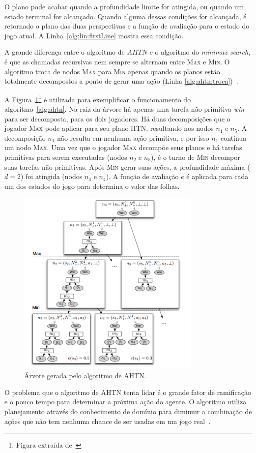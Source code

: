 O plano pode acabar quando a profundidade limite for atingida, ou quando um estado terminal for alcançado.
Quando alguma dessas condições for alcançada, é retornado o plano das duas perspectivas e a função de avaliação para o estado do jogo atual. A Linha~\ref{alg:lin:firstLine} mostra essa condição.

A grande diferença entre o algoritmo de $AHTN$ e o algoritmo do \textit{minimax search}, é que as chamadas recursivas nem sempre se alternam entre \textsc{Max} e \textsc{Min}. 
O algoritmo troca de nodos \textsc{Max} para \textsc{Min} apenas quando os planos estão totalmente decompostos a ponto de gerar uma ação (Linha \ref{alg:ahtn:troca})~\cite{ontanon2015adversarial}.

A Figura~\ref{fig:ahtn}\footnote{Figura extraída de~\cite{ontanon2015adversarial}} é utilizada para exemplificar o funcionamento do algoritmo~\ref{alg:ahtn}. 
Na raiz da árvore há apenas uma tarefa não primitiva \textit{win} para ser decomposta, para os dois jogadores. 
Há duas decomposições que o jogador \textsc{Max} pode aplicar para seu plano HTN, resultando nos nodos $n_{1}$ e $n_{5}$. A decomposição $n_{1}$ não resulta em nenhuma ação primitiva, e por isso $n_{1}$ continua um nodo \textsc{Max}. Uma vez que o jogador \textsc{Max} decompõe seus planos e há tarefas primitivas para serem executadas (nodos $n_{2}$ e $n_{5}$), é o turno de \textsc{Min} decompor suas tarefas não primitivas. Após \textsc{Min} gerar suas ações, a profundidade máxima ($d = 2$) foi atingida (nodos $n_{3}$ e $n_{4}$). 
A função de avaliação $e$ é aplicada para cada um dos estados do jogo para determina o valor das folhas.

\begin{figure}[ht]
	\centering
	\includegraphics[width=0.8\textwidth]{fig/ahtn.pdf} 
	\caption{Árvore gerada pelo algoritmo de AHTN.}
	\label{fig:ahtn}
\end{figure}

O problema que o algoritmo de AHTN tenta lidar é o grande fator de ramificação e o pouco tempo para determinar a próxima ação do agente. O algoritmo utiliza planejamento através do conhecimento de domínio para diminuir a combinação de ações que não tem nenhuma chance de ser usadas em um jogo real~\cite{ontanon2015adversarial}.
